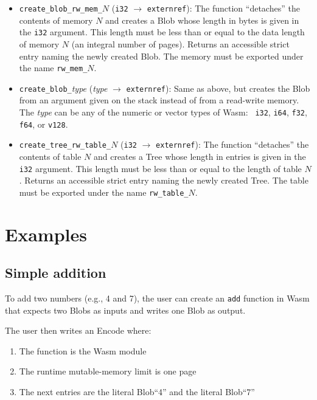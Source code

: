 \documentclass{article}
\newcommand{\blob}{\textrm{Blob}\xspace}
\newcommand{\blobs}{\textrm{Blob}s\xspace}
\newcommand{\encode}{\textrm{Encode}\xspace}
\newcommand{\tree}{\textrm{Tree}\xspace}
\newcommand{\bs}{\vspace{\baselineskip}}
\begin{document}
\begin{itemize}
\item \texttt{create\_blob\_rw\_mem\_}$N$ (\texttt{i32} $\rightarrow$
  \texttt{externref}): The function ``detaches'' the contents of
  memory $N$ and creates a \blob whose length in bytes is given in
  the \texttt{i32} argument. This length must be less than or equal to
  the data length of memory $N$ (an integral number of pages). Returns
  an accessible strict entry naming the newly created \blob. The
  memory must be exported under the name \texttt{rw\_mem\_}$N$.

\item \texttt{create\_blob\_}\emph{type} (\emph{type} $\rightarrow$
  \texttt{externref}): Same as above, but creates the \blob from an
  argument given on the stack instead of from a read-write memory. The
  \emph{type} can be any of the numeric or vector types of Wasm: {\tt
    i32}, {\tt i64}, {\tt f32}, {\tt f64}, or {\tt v128}.

\item \texttt{create\_tree\_rw\_table\_}$N$ (\texttt{i32}
  $\rightarrow$ \texttt{externref}): The function ``detaches'' the
  contents of table $N$ and creates a \tree whose length in entries is
  given in the \texttt{i32} argument. This length must be less than or
  equal to the length of table $N$. Returns an accessible strict entry
  naming the newly created \tree. The table must be exported under the
  name \texttt{rw\_table\_}$N$.
  
\end{itemize}


\section{Examples}

\subsection{Simple addition} To add two numbers (e.g., 4 and
7), the user can create an \texttt{add} function in Wasm that expects
two \blobs as inputs and writes one \blob as output.

\bs

The user then writes an \encode where:
\begin{enumerate}[itemsep=0pt]
\item The function is the Wasm module
\item The runtime mutable-memory limit is one page
\item The next entries are the literal \blob ``4'' and the literal \blob ``7''
\end{enumerate}
\end{document}
